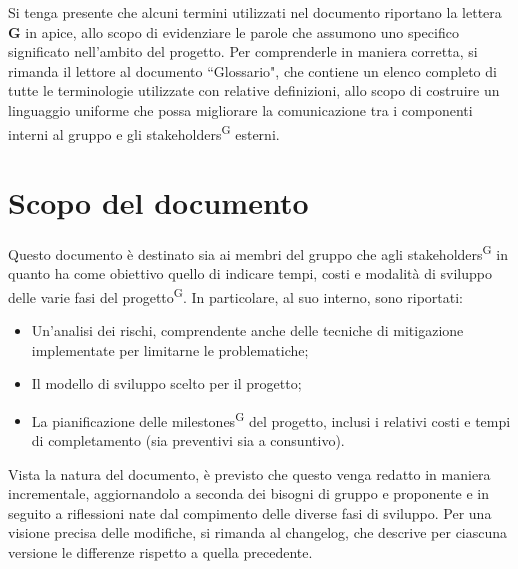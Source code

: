 \begin{beginningnote}
    Si tenga presente che alcuni termini utilizzati nel documento riportano la lettera \textbf{G} in apice, allo scopo di evidenziare le parole che assumono uno specifico significato nell'ambito del progetto. Per comprenderle in maniera corretta, si rimanda il lettore al documento ``Glossario", che contiene un elenco completo di tutte le terminologie utilizzate con relative definizioni, allo scopo di costruire un linguaggio uniforme che possa migliorare la comunicazione tra i componenti interni al gruppo e gli stakeholders\textsuperscript{G} esterni.   %
\end{beginningnote}

\section{Scopo del documento}\label{sec:scopo_del_documento}
Questo documento è destinato sia ai membri del gruppo che agli stakeholders\textsuperscript{G} in quanto ha come obiettivo quello di indicare tempi, costi e modalità di sviluppo delle varie fasi del progetto\textsuperscript{G}.
In particolare, al suo interno, sono riportati:
\begin{itemize}
    \item Un'analisi dei rischi, comprendente anche delle tecniche di mitigazione implementate per limitarne le problematiche;
    \item Il modello di sviluppo scelto per il progetto;
    \item La pianificazione delle milestones\textsuperscript{G} del progetto, inclusi i relativi costi e tempi di completamento (sia preventivi sia a consuntivo).
\end{itemize}
Vista la natura del documento, è previsto che questo venga redatto in maniera incrementale, aggiornandolo a seconda dei bisogni di gruppo e proponente e in seguito a riflessioni nate dal compimento delle diverse fasi di sviluppo. Per una visione precisa delle modifiche, si rimanda al changelog, che descrive per ciascuna versione le differenze rispetto a quella precedente.


